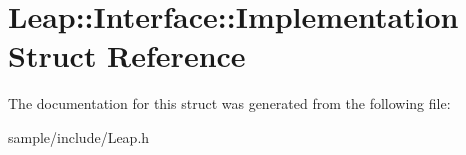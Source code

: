 \hypertarget{struct_leap_1_1_interface_1_1_implementation}{}\section{Leap\+:\+:Interface\+:\+:Implementation Struct Reference}
\label{struct_leap_1_1_interface_1_1_implementation}


The documentation for this struct was generated from the following file\+:\begin{DoxyCompactItemize}
\item 
sample/include/Leap.\+h\end{DoxyCompactItemize}
